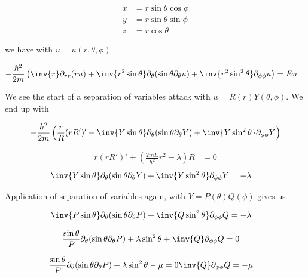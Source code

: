 \begin{align*}
x &= r \sin\theta \cos\phi \\
y &= r \sin\theta \sin\phi \\
z &= r \cos\theta
\end{align*}

we have with $u = u(r,\theta, \phi)$

\begin{align*}
-\frac{\hbar^2}{2m} \left(
\inv{r} \partial_{rr} (r u) +  \inv{r^2 \sin\theta} \partial_\theta (\sin\theta \partial_\theta u)
+ \inv{r^2 \sin^2\theta} \partial_{\phi\phi} u
 \right)
&= E u
\end{align*}

We see the start of a separation of variables attack with $u = R(r) Y(\theta, \phi)$.  We end up with

\begin{align*}
-\frac{\hbar^2}{2m} &\left(
\frac{r}{R} (r R')' +  \inv{Y \sin\theta} \partial_\theta (\sin\theta \partial_\theta Y)
+ \inv{Y \sin^2\theta} \partial_{\phi\phi} Y
 \right) \\
\end{align*}

\begin{align*}
r (r R')' + \left( \frac{2m E}{\hbar^2} r^2 - \lambda \right) R &= 0
\end{align*}
\begin{align*}
\inv{Y \sin\theta} \partial_\theta (\sin\theta \partial_\theta Y) + \inv{Y \sin^2\theta} \partial_{\phi\phi} Y &= -\lambda
\end{align*}

Application of separation of variables again, with $Y = P(\theta) Q(\phi)$ gives us

\begin{align*}
\inv{P \sin\theta} \partial_\theta (\sin\theta \partial_\theta P) + \inv{Q \sin^2\theta} \partial_{\phi\phi} Q &= -\lambda
\end{align*}

\begin{align*}
\frac{\sin\theta}{P } \partial_\theta (\sin\theta \partial_\theta P)
+\lambda  \sin^2\theta
+ \inv{Q } \partial_{\phi\phi} Q &= 0
\end{align*}

\begin{align*}
\frac{\sin\theta}{P } \partial_\theta (\sin\theta \partial_\theta P) + \lambda \sin^2\theta - \mu = 0
\inv{Q } \partial_{\phi\phi} Q &= -\mu
\end{align*}

